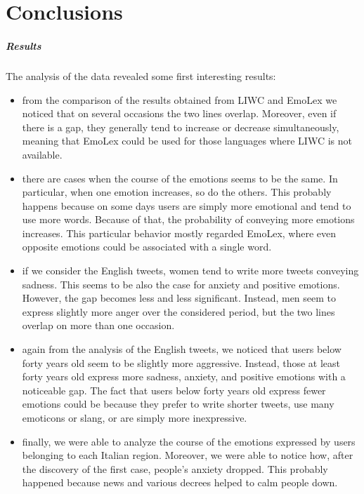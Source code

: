 

\chapter{Conclusions}
\label{cha:conclusions}

\paragraph{Results}

The analysis of the data revealed some first interesting results:

\begin{itemize}
	\item from the comparison of the results obtained from LIWC and EmoLex we noticed that on several occasions the two lines overlap. Moreover, even if there is a gap, they generally tend to increase or decrease simultaneously, meaning that EmoLex could be used for those languages where LIWC is not available.
	\item there are cases when the course of the emotions seems to be the same. In particular, when one emotion increases, so do the others. This probably happens because on some days users are simply more emotional and tend to use more words. Because of that, the probability of conveying more emotions increases. This particular behavior mostly regarded EmoLex, where even opposite emotions could be associated with a single word.
	\item if we consider the English tweets, women tend to write more tweets conveying sadness. This seems to be also the case for anxiety and positive emotions. However, the gap becomes less and less significant. Instead, men seem to express slightly more anger over the considered period, but the two lines overlap on more than one occasion.
	\item again from the analysis of the English tweets, we noticed that users below forty years old seem to be slightly more aggressive. Instead, those at least forty years old express more sadness, anxiety, and positive emotions with a noticeable gap. The fact that users below forty years old express fewer emotions could be because they prefer to write shorter tweets, use many emoticons or slang, or are simply more inexpressive.
	\item finally, we were able to analyze the course of the emotions expressed by users belonging to each Italian region. Moreover, we were able to notice how, after the discovery of the first case, people's anxiety dropped. This probably happened because news and various decrees helped to calm people down.
\end{itemize}


